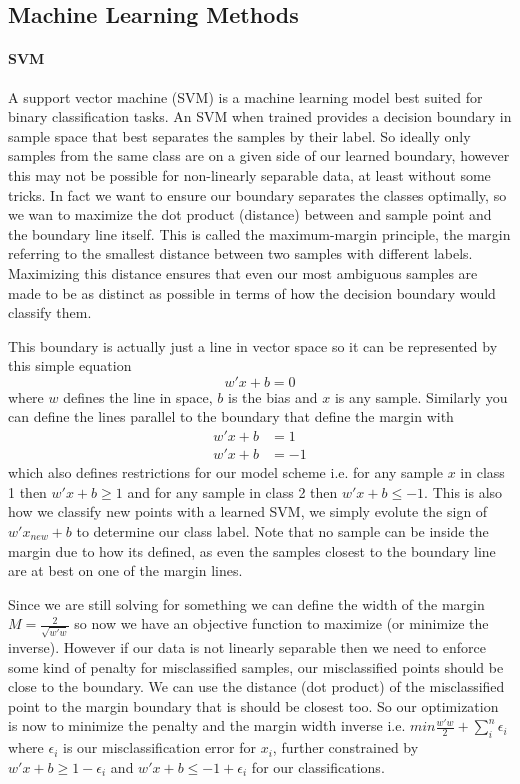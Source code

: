 \subsection{Machine Learning Methods}
\paragraph{SVM}
A support vector machine (SVM) is a machine learning model best suited for binary classification tasks.
An SVM  when trained provides a decision boundary in sample space that best separates the samples by their label.
So ideally only samples from the same class are on a given side of our learned boundary, however this may not be possible for non-linearly separable data, at least without some tricks.
In fact we want to ensure our boundary separates the classes optimally, so we wan to maximize the dot product (distance) between and sample point and the boundary line itself.
This is called the maximum-margin principle, the margin referring to the smallest distance between two samples with different labels.
Maximizing this distance ensures that even our most ambiguous samples are made to be as distinct as possible in terms of how the decision boundary would classify them.

This boundary is actually just a line in vector space so it can be represented by this simple equation
$$ w'x+b=0$$
where $w$ defines the line in space, $b$ is the bias and $x$ is any sample.
Similarly you can define the lines parallel to the boundary that define the margin with
\begin{align}
    w'x+b &= 1 \\
    w'x+b &= -1
\end{align}
which also defines restrictions for our model scheme i.e. for any sample $x$ in class 1 then $w'x+b \geq 1$ and for any sample in class 2 then $w'x+b \leq -1$.
This is also how we classify new points with a learned SVM, we simply evolute the sign of $w'x_{new}+b$ to determine our class label.
Note that no sample can be inside the margin due to how its defined, as even the samples closest to the boundary line are at best on one of the margin lines.

Since we are still solving for something we can define the width of the margin $M = \frac{2}{\sqrt{w'w}}$ so now we have an objective function to maximize (or minimize the inverse).
However if our data is not linearly separable then we need to enforce some kind of penalty for misclassified samples, our misclassified points should be close to the boundary.
We can use the distance (dot product) of the misclassified point to the margin boundary that is should be closest too.
So our optimization is now to minimize the penalty and the margin width inverse i.e. $min \frac{w'w}{2}+\sum_i^n \epsilon_i$ where $\epsilon_i$ is our misclassification error for $x_i$, further constrained by $w'x+b\geq 1-\epsilon_i$ and $w'x+b\leq -1+\epsilon_i$ for our classifications.

